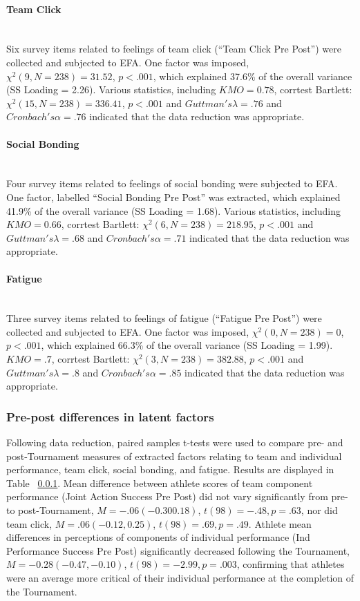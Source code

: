 \documentclass[12pt]{report}
\newcommand{\myparagraph}[1]{\paragraph{#1}\mbox{}\\}
\begin{document}
{\myparagraph{Team Click}
Six survey items related to feelings of team click (``Team Click Pre Post'') were collected and subjected to EFA. One factor was imposed, $\chi^2(9, N = 238) = 31.52 $, $p < .001$, which explained 37.6\% of the overall variance (SS Loading = 2.26).  Various statistics, including $KMO = 0.78$, corrtest Bartlett: $\chi^2(15, N = 238) = 336.41$, $p < .001$ and $Guttman's \lambda =.76$ and $Cronbach's \alpha = .76$ indicated that the data reduction was appropriate.

\myparagraph{Social Bonding}
Four survey items related to feelings of social bonding were subjected to EFA. One factor, labelled ``Social Bonding Pre Post'' was extracted, which explained 41.9\% of the overall variance (SS Loading = 1.68).  Various statistics, including $KMO = 0.66$, corrtest Bartlett: $\chi^2(6, N = 238) = 218.95$, $p < .001$ and $Guttman's \lambda =.68$ and $Cronbach's \alpha = .71$ indicated that the data reduction was appropriate.

\myparagraph{Fatigue}
Three survey items related to feelings of fatigue (``Fatigue Pre Post'') were collected and subjected to EFA. One factor was imposed, $\chi^2(0, N = 238) = 0 $, $p < .001$, which explained 66.3\% of the overall variance (SS Loading = 1.99).  $KMO = .7$, corrtest Bartlett: $\chi^2(3, N = 238) = 382.88$, $p < .001$ and $Guttman's \lambda =.8$ and $Cronbach's \alpha = .85$ indicated that the data reduction was appropriate.

\subsubsection{Pre-post differences in latent factors}
Following data reduction, paired samples t-tests were used to compare pre- and post-Tournament measures of extracted factors relating to team and individual performance, team click, social bonding, and fatigue. Results are displayed in Table ~\ref{}.  Mean difference between athlete scores of team component performance (Joint Action Success Pre Post) did not vary significantly from pre- to post-Tournament, $M = -.06 (-0.30  0.18)$, $t(98)= -.48, p = .63$, nor did team click, $M = .06 (-0.12, 0.25)$, $t(98)= .69, p = .49$. Athlete mean differences in perceptions of components of individual performance (Ind Performance Success Pre Post) significantly decreased following the Tournament, $M = -0.28 (-0.47, -0.10)$, $t(98)= -2.99, p = .003$, confirming that athletes were an average more critical of their individual performance at the completion of the Tournament.

}
\end{document}
